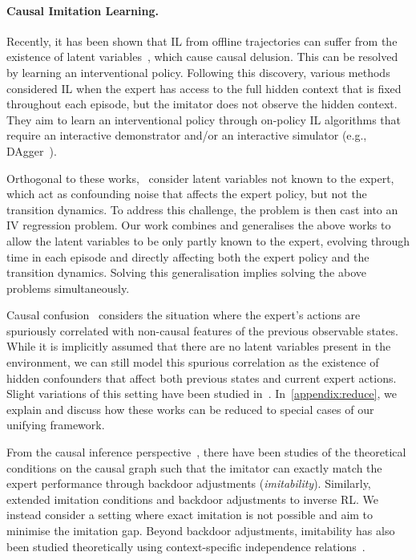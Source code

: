 \vspace{-4pt}
\paragraph{Causal Imitation Learning.}
Recently, it has been shown that IL from offline trajectories can suffer from the existence of latent variables~\citep{Ortega2021}, which cause causal delusion. This can be resolved by learning an interventional policy. Following this discovery, various methods~\citep{Vuorio2022,Swamy2022} considered IL when the expert has access to the full hidden context that is fixed throughout each episode, but the imitator does not observe the hidden context. 
They aim to learn an interventional policy through on-policy IL algorithms that require an interactive demonstrator and/or an interactive simulator (e.g., DAgger~\citep{Ross2011}). 

Orthogonal to these works,~\citet{Swamy2022_temporal} consider latent variables not known to the expert, which act as confounding noise that affects the expert policy, but not the transition dynamics. To address this challenge, the problem is then cast into an IV regression problem. 
Our work combines and generalises the above works \citep{Vuorio2022,Swamy2022,Swamy2022_temporal} to allow the latent variables to be only partly known to the expert, evolving through time in each episode and directly affecting both the expert policy and the transition dynamics. Solving this generalisation implies solving the above problems simultaneously. 

Causal confusion~\citep{deHaan2019,Pfrommer2023} considers the situation where the expert's actions are spuriously correlated with non-causal features of the previous observable states. While it is implicitly assumed that there are no latent variables present in the environment, we can still model this spurious correlation as the existence of hidden confounders that affect both previous states and current expert actions. Slight variations of this setting have been studied in~\citet{Wen2020,Spencer2021,Codevilla2019}. In~\cref{appendix:reduce}, we explain and discuss how these works can be reduced to special cases of our unifying framework.


From the causal inference perspective~\citep{Kumor2021,Zhang2020}, there have been studies of the theoretical conditions on the causal graph such that the imitator can exactly match the expert performance through backdoor adjustments (\textit{imitability}). Similarly, \citet{Ruan2023} extended imitation conditions and backdoor adjustments to inverse RL. We instead consider a setting where exact imitation is not possible and aim to minimise the imitation gap. Beyond backdoor adjustments, imitability has also been studied theoretically using context-specific independence relations~\citep{Jamshidi2023}.

